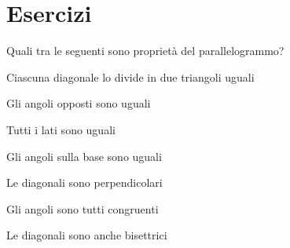 \section{Esercizi}

\begin{esercizio}
\label{ese:4.1}
Quali tra le seguenti sono proprietà del parallelogrammo?
\begin{enumeratea}
\item Ciascuna diagonale lo divide in due triangoli uguali\hfill\boxV\quad\boxF
\item Gli angoli opposti sono uguali\hfill\boxV\quad\boxF
\item Tutti i lati sono uguali\hfill\boxV\quad\boxF
\item Gli angoli sulla base sono uguali\hfill\boxV\quad\boxF
\item Le diagonali sono perpendicolari\hfill\boxV\quad\boxF
\item Gli angoli sono tutti congruenti\hfill\boxV\quad\boxF
\item Le diagonali sono anche bisettrici\hfill\boxV\quad\boxF
\end{enumeratea}
\end{esercizio}

